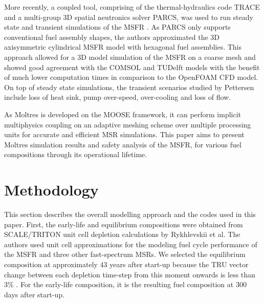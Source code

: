 \documentclass{anstrans}
\begin{document}
	More recently, a coupled tool, comprising of the thermal-hydraulics code
	TRACE and a multi-group 3D spatial neutronics solver \gls{PARCS}, was
	used to run steady state and transient simulations of the \gls{MSFR}
	\cite{pettersen_coupled_2016}. As \gls{PARCS} only supports conventional
	fuel assembly shapes, the authors approximated the 3D axisymmetric
	cylindrical \gls{MSFR} model with
	hexagonal fuel assemblies. This approach allowed for a 3D model
	simulation of the \gls{MSFR} on a coarse mesh and showed good agreement
	with the COMSOL and TUDelft models with the benefit of much lower
	computation times in comparison to the OpenFOAM CFD model. On top of
	steady state simulations, the transient scenarios studied by Pettersen
	include loss of heat sink, pump over-speed, over-cooling and loss of flow.
	
	As Moltres is developed on the \gls{MOOSE} framework, it can perform
	implicit multiphysics coupling on an adaptive meshing scheme over multiple
	processing units for accurate and efficient \gls{MSR} simulations.
	This paper aims to present Moltres simulation results and safety analysis
	of the \gls{MSFR}, for various fuel compositions through its operational
	lifetime. 

\section{Methodology}

	This section describes the overall modelling approach and the codes used
	in this paper. First, the early-life and equilibrium compositions were
	obtained from SCALE/TRITON unit cell depletion calculations by Rykhlevskii
	et al. \cite{rykhlevskii_fuel_2019} The authors used unit cell
	approximations for the modeling
	fuel cycle performance of the \gls{MSFR} and three other fast-spectrum
	\glspl{MSR}. We selected the equilibrium composition at
	approximately 43 years after start-up because the TRU vector change
	between each depletion time-step from this moment onwards is less than 3\%
	\cite{rykhlevskii_fuel_2019}. For the early-life composition, it is the 
	resulting fuel composition at 300 days after start-up.
	
\end{document}
